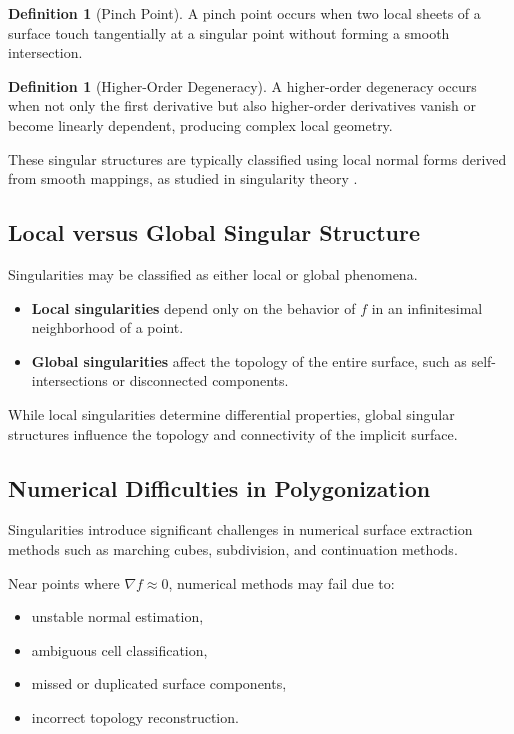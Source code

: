 \documentclass[12pt, a4paper, oneside]{book}
\theoremstyle{plain}
\theoremstyle{definition}
\newtheorem{definition}[theorem]{Definition}
\theoremstyle{remark}
\theoremstyle{definition}
\begin{document}
\begin{definition}[Pinch Point]
A pinch point occurs when two local sheets of a surface touch tangentially at a singular point without forming a smooth intersection.
\end{definition}

\begin{definition}[Higher-Order Degeneracy]
A higher-order degeneracy occurs when not only the first derivative but also higher-order derivatives vanish or become linearly dependent, producing complex local geometry.
\end{definition}

These singular structures are typically classified using local normal forms derived from smooth mappings, as studied in singularity theory \cite{arnold2012singularities}.

\subsection{Local versus Global Singular Structure}

Singularities may be classified as either local or global phenomena.

\begin{itemize}
    \item \textbf{Local singularities} depend only on the behavior of $f$ in an infinitesimal neighborhood of a point.
    \item \textbf{Global singularities} affect the topology of the entire surface, such as self-intersections or disconnected components.
\end{itemize}

While local singularities determine differential properties, global singular structures influence the topology and connectivity of the implicit surface.

\subsection{Numerical Difficulties in Polygonization}

Singularities introduce significant challenges in numerical surface extraction methods such as marching cubes, subdivision, and continuation methods.

Near points where $\nabla f \approx 0$, numerical methods may fail due to:
\begin{itemize}
    \item unstable normal estimation,
    \item ambiguous cell classification,
    \item missed or duplicated surface components,
    \item incorrect topology reconstruction.
\end{itemize}
\end{document}
